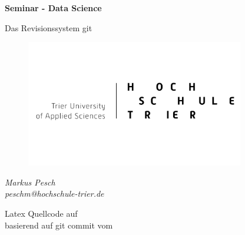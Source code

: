 \begin{titlepage}
  \begin{center}
    \begin{huge}
      \begin{singlespace}
        \textbf{Seminar - Data Science}
      \end{singlespace}
    \end{huge}
    \vspace{1.2cm}
    \begin{Large}
      Das Revisionssystem git
    \end{Large}

    \vspace{0.5cm}

    \begin{figure}[h]
      \centering
      \includegraphics[width=0.85\textwidth]{images//logo.png}
      \label{img:fh-trier-logo}
    \end{figure}

    \vspace{2cm}
    \begin{large}
      \textit{Markus Pesch} \\
      \textit{peschm@hochschule-trier.de}
    \end{large}
    \vspace{2cm}
    
    Latex Quellcode auf  \\
    basierend auf git commit  vom 
    
    
  \end{center}
\end{titlepage}
